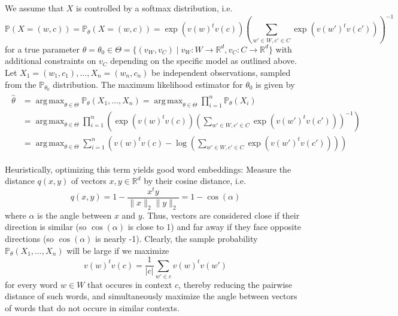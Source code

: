 \documentclass{amsart}
\theoremstyle{plain}
\theoremstyle{definition}
\newcommand{\R}{\mathbb{R}}
\renewcommand{\P}{\mathbb{P}}
\DeclareMathOperator*{\argmax}{arg\,max}
\begin{document}
We assume that $X$ is controlled by a softmax distribution, i.e.
\begin{equation*}
  \P(X = (w, c)) = \P_{\theta}(X = (w, c)) = \exp \left(v(w)^t v(c)\right) \left( \sum_{w' \in W, c' \in C} \exp \left( v(w')^t v(c') \right) \right)^{-1}
\end{equation*}
for a true parameter $\theta = \theta_0 \in \Theta = \{ (v_W, v_C) \mid v_W : W \rightarrow \R^d, v_C : C \rightarrow \R^d \}$ with additional constraints on $v_C$ depending on the specific model as outlined above.
Let $X_1 = (w_1, c_1), \dots, X_n = (w_n, c_n)$ be independent observations, sampled from the $\P_{\theta_0}$ distribution.
The maximum likelihood estimator for $\theta_0$ is given by
\begin{align}
  \begin{split}
  \label{eq:def-ml-estimator}
  \hat \theta &= \argmax_{\theta \in \Theta} \P_\theta(X_1, \dots, X_n) = \argmax_{\theta \in \Theta} \prod_{i = 1}^n \P_\theta(X_i) \\
             & = \argmax_{\theta \in \Theta} \prod_{i = 1}^n \left( \exp \left(v(w)^t v(c) \right) \left(\sum_{w' \in W, c' \in C} \exp \left(v(w')^t v(c')\right) \right)^{-1} \right) \\
             & = \argmax_{\theta \in \Theta} \sum_{i = 1}^n \left( v(w)^t v(c) - \log \left(\sum_{w' \in W, c' \in C} \exp \left(v(w')^t v(c')\right) \right) \right)
  \end{split}
\end{align}

Heuristically, optimizing this term yields good word embeddings:
Measure the distance $q(x, y)$ of vectors $x, y \in \R^d$ by their cosine distance, i.e.
\begin{equation*}
  q(x, y) = 1 - \frac{x^t y}{\lVert x \rVert_2 \lVert y \rVert_2} = 1 - \cos(\alpha)
\end{equation*}
where $\alpha$ is the angle between $x$ and $y$.
Thus, vectors are considered close if their direction is similar (so $\cos(\alpha)$ is close to 1) and far away if they face opposite directions (so $\cos(\alpha)$ is nearly -1).
Clearly, the sample probability $\P_\theta(X_1, \dots, X_n)$ will be large if we maximize 
\begin{equation*}
  v(w)^t v(c) = \frac{1}{|c|} \sum_{w' \in c} v(w)^t v(w')
\end{equation*}
for every word $w \in W$ that occures in context $c$, thereby reducing the pairwise distance of such words, and simultaneously maximize the angle between vectors of words that do not occure in similar contexts.
\end{document}
